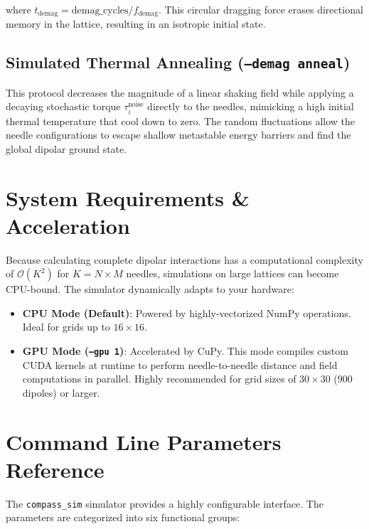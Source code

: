 \documentclass[11pt,a4paper]{article}
\newcommand{\code}[1]{\texttt{#1}}
\begin{document}
\noindent
where $t_{\text{demag}} = \text{demag\_cycles} / f_{\text{demag}}$. This circular dragging force erases directional memory in the lattice, resulting in an isotropic initial state.

\subsection{Simulated Thermal Annealing (\code{--demag anneal})}
This protocol decreases the magnitude of a linear shaking field while applying a decaying stochastic torque $\tau_i^{\text{noise}}$ directly to the needles, mimicking a high initial thermal temperature that cool down to zero. The random fluctuations allow the needle configurations to escape shallow metastable energy barriers and find the global dipolar ground state.

\section{System Requirements \& Acceleration}
\label{sec:acceleration}

Because calculating complete dipolar interactions has a computational complexity of $\mathcal{O}(K^2)$ for $K = N \times M$ needles, simulations on large lattices can become CPU-bound. The simulator dynamically adapts to your hardware:

\begin{itemize}
    \item \textbf{CPU Mode (Default)}: Powered by highly-vectorized NumPy operations. Ideal for grids up to $16 \times 16$.
    \item \textbf{GPU Mode (\code{--gpu 1})}: Accelerated by CuPy. This mode compiles custom CUDA kernels at runtime to perform needle-to-needle distance and field computations in parallel. Highly recommended for grid sizes of $30 \times 30$ (900 dipoles) or larger.
\end{itemize}

\section{Command Line Parameters Reference}
\label{sec:parameters}

The \code{compass\_sim} simulator provides a highly configurable interface. The parameters are categorized into six functional groups:
\end{document}
